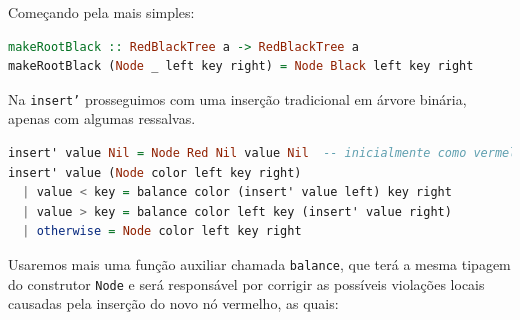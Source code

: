 Começando pela mais simples:

\begin{lstlisting}[language=haskell, caption={Função auxiliar 1}]
makeRootBlack :: RedBlackTree a -> RedBlackTree a
makeRootBlack (Node _ left key right) = Node Black left key right
\end{lstlisting}
\FloatBarrier

Na \texttt{insert'} prosseguimos com uma inserção tradicional em árvore binária, apenas com algumas ressalvas.

\begin{lstlisting}[language=haskell,caption={Função auxiliar 2}]
insert' value Nil = Node Red Nil value Nil  -- inicialmente como vermelho
insert' value (Node color left key right)                      
  | value < key = balance color (insert' value left) key right  
  | value > key = balance color left key (insert' value right) 
  | otherwise = Node color left key right                      
\end{lstlisting}
\FloatBarrier

Usaremos mais uma função auxiliar chamada \texttt{balance}, que terá a mesma tipagem do construtor \texttt{Node} e será responsável por corrigir as possíveis violações locais causadas pela inserção do novo nó vermelho, as quais:

